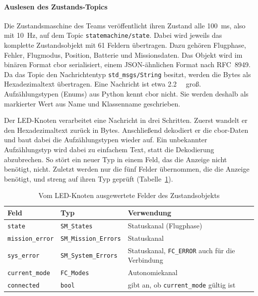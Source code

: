             \paragraph{Auslesen des Zustands-Topics}
            Die Zustandsmaschine des Teams veröffentlicht ihren Zustand alle \SI{100}{\milli\second}, also mit \SI{10}{\hertz}, auf dem Topic \texttt{statemachine/state}. Dabei wird jeweils das komplette Zustandsobjekt mit 61 Feldern übertragen. Dazu gehören Flugphase, Fehler, Flugmodus, Position, Batterie und Missionsdaten. Das Objekt wird im binären Format \gls{cbor} serialisiert, einem JSON-ähnlichen Format nach RFC~8949. Da das Topic den Nachrichtentyp \texttt{std\_msgs/String} besitzt, werden die Bytes als Hexadezimaltext übertragen. Eine Nachricht ist etwa \SI{2,2}{\kilo\byte} groß. Aufzählungstypen (Enums) aus Python kennt \gls{cbor} nicht. Sie werden deshalb als markierter Wert aus Name und Klassenname geschrieben. %

            Der LED-Knoten verarbeitet eine Nachricht in drei Schritten. Zuerst wandelt er den Hexadezimaltext zurück in Bytes. Anschließend dekodiert er die \gls{cbor}-Daten und baut dabei die Aufzählungstypen wieder auf. Ein unbekannter Aufzählungstyp wird dabei zu einfachem Text, statt die Dekodierung abzubrechen. So stört ein neuer Typ in einem Feld, das die Anzeige nicht benötigt, nicht. Zuletzt werden nur die fünf Felder übernommen, die die Anzeige benötigt, und streng auf ihren Typ geprüft (Tabelle~\ref{tab:LED_Felder}).

            \begin{table}[H]
                \centering
                \caption{Vom LED-Knoten ausgewertete Felder des Zustandsobjekts}
                \label{tab:LED_Felder}
                \begin{tabularx}{\textwidth}{l l X}
                    \toprule
                    \textbf{Feld} & \textbf{Typ} & \textbf{Verwendung} \\
                    \midrule
                    \texttt{state}          & \texttt{SM\_States}          & Statuskanal (Flugphase) \\
                    \texttt{mission\_error} & \texttt{SM\_Mission\_Errors} & Statuskanal \\
                    \texttt{sys\_error}     & \texttt{SM\_System\_Errors}  & Statuskanal, \texttt{FC\_ERROR} auch für die Verbindung \\
                    \texttt{current\_mode}  & \texttt{FC\_Modes}           & Autonomiekanal \\
                    \texttt{connected}      & \texttt{bool}                & gibt an, ob \texttt{current\_mode} gültig ist \\
                    \bottomrule
                \end{tabularx}
            \end{table}

